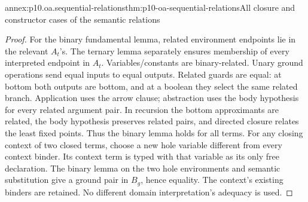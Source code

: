 \begin{annexitem}{annex:p10.oa.sequential-relations}{thm:p10-oa-sequential-relations}{All closure and constructor cases of the semantic relations}
\begin{proof}
For the binary fundamental lemma, related environment endpoints lie in
the relevant \(A_t\)'s. The ternary lemma separately ensures membership
of every interpreted endpoint in \(A_t\). Variables/constants are
binary-related. Unary ground operations send equal inputs to equal
outputs. Related guards are equal: at bottom both outputs are bottom,
and at a boolean they select the same related branch. Application uses
the arrow clause; abstraction uses the body hypothesis for every related
argument pair. In recursion the bottom approximants are related, the
body hypothesis preserves related pairs, and directed closure relates
the least fixed points. Thus the binary lemma holds for all terms.
For any closing context of two closed terms, choose a new hole variable
different from every context binder. Its context term is typed with
that variable as its only free declaration. The binary lemma on the
two hole environments and semantic substitution give a ground pair in
\(B_g\), hence equality. The context's existing binders are retained.
No different domain interpretation's adequacy is used.
\end{proof}
\end{annexitem}

